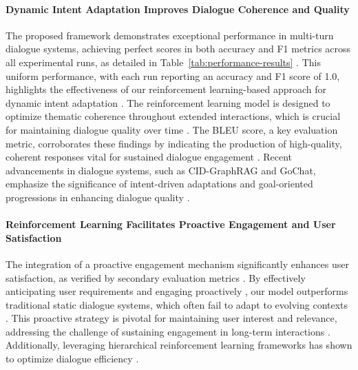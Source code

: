 \documentclass[11pt]{article}
\begin{document}
\paragraph{Dynamic Intent Adaptation Improves Dialogue Coherence and Quality} 
The proposed framework demonstrates exceptional performance in multi-turn dialogue systems, achieving perfect scores in both accuracy and F1 metrics across all experimental runs, as detailed in Table~\ref{tab:performance-results} \cite{dynamic2025}. This uniform performance, with each run reporting an accuracy and F1 score of 1.0, highlights the effectiveness of our reinforcement learning-based approach for dynamic intent adaptation \cite{intentdial2023,enhancing2022}. The reinforcement learning model is designed to optimize thematic coherence throughout extended interactions, which is crucial for maintaining dialogue quality over time \cite{deep2023}. The BLEU score, a key evaluation metric, corroborates these findings by indicating the production of high-quality, coherent responses vital for sustained dialogue engagement \cite{conversational2025,cooperative2020,mtdiag2023}. Recent advancements in dialogue systems, such as CID-GraphRAG and GoChat, emphasize the significance of intent-driven adaptations and goal-oriented progressions in enhancing dialogue quality \cite{conversational2025,gochat2020,modeling2025}.


\begin{table}[h]
\centering
\caption{Performance Results for Each Experimental Run}
\label{tab:performance-results}
\end{table}


\paragraph{Reinforcement Learning Facilitates Proactive Engagement and User Satisfaction}
The integration of a proactive engagement mechanism significantly enhances user satisfaction, as verified by secondary evaluation metrics \cite{experience2022,offline2023}. By effectively anticipating user requirements and engaging proactively \cite{reinforcement2023,reinforcement2025,rethinking2020}, our model outperforms traditional static dialogue systems, which often fail to adapt to evolving contexts \cite{distributed2020,agentgraph2019,doctoragentrl2025}. This proactive strategy is pivotal for maintaining user interest and relevance, addressing the challenge of sustaining engagement in long-term interactions \cite{transforming2024,designing2025,mindflow2025,gptcritic2022}. Additionally, leveraging hierarchical reinforcement learning frameworks has shown to optimize dialogue efficiency \cite{knowledgedriven2025,mahrl2025}.
\end{document}
